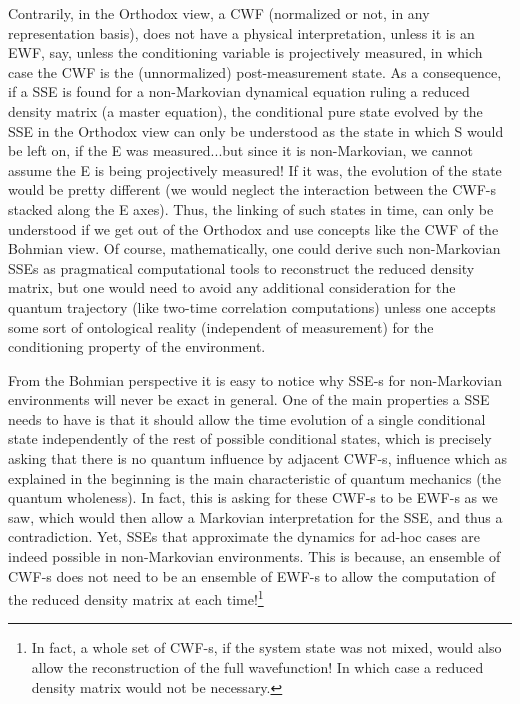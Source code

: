 \documentclass[11pt, a4paper]{article} %
\begin{document}
Contrarily, in the Orthodox view, a CWF (normalized or not, in any representation basis), does not have a physical interpretation, unless it is an EWF, say, unless the conditioning variable is projectively measured, in which case the CWF is the (unnormalized) post-measurement state. As a consequence, if a SSE is found for a non-Markovian dynamical equation ruling a reduced density matrix (a master equation), the conditional pure state evolved by the SSE in the Orthodox view can only be understood as the state in which S would be left on, if the E was measured...but since it is non-Markovian, we cannot assume the E is being projectively measured! If it was, the evolution of the state would be pretty different (we would neglect the interaction between the CWF-s stacked along the E axes). Thus, the linking of such states in time, can only be understood if we get out of the Orthodox and use concepts like the CWF of the Bohmian view. Of course, mathematically, one could derive such non-Markovian SSEs as pragmatical computational tools to reconstruct the reduced density matrix, but one would need to avoid any additional consideration for the quantum trajectory (like two-time correlation computations) unless one accepts some sort of ontological reality (independent of measurement) for the conditioning property of the environment.

From the Bohmian perspective it is easy to notice why SSE-s for non-Markovian environments will never be exact in general. One of the main properties a SSE needs to have is that it should allow the time evolution of a single conditional state independently of the rest of possible conditional states, which is precisely asking that there is no quantum influence by adjacent CWF-s, influence which as explained in the beginning is the main characteristic of quantum mechanics (the quantum wholeness). In fact, this is asking for these CWF-s to be EWF-s as we saw, which would then allow a Markovian interpretation for the SSE, and thus a contradiction. Yet, SSEs that approximate the dynamics for ad-hoc cases are indeed possible in non-Markovian environments. This is because, an ensemble of CWF-s does not need to be an ensemble of EWF-s to allow the computation of the reduced density matrix at each time!\footnote{In fact, a whole set of CWF-s, if the system state was not mixed, would also allow the reconstruction of the full wavefunction! In which case a reduced density matrix would not be necessary.} 
\end{document}
